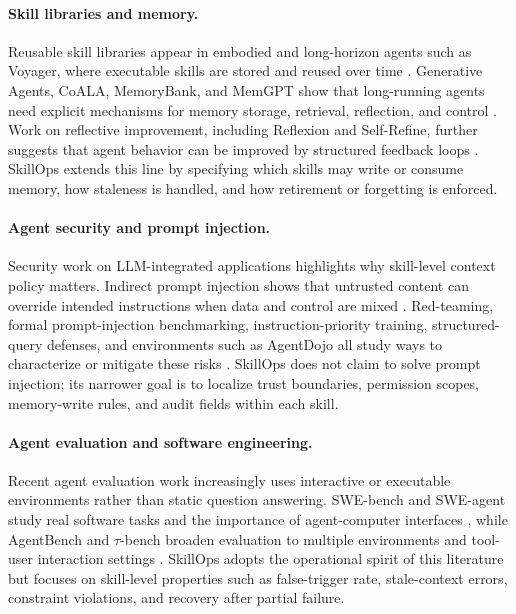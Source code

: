 \documentclass[11pt]{article}
\begin{document}
\paragraph{Skill libraries and memory.}

Reusable skill libraries appear in embodied and long-horizon agents such as
Voyager, where executable skills are stored and reused over time
\citep{wang2024voyager}. Generative Agents, CoALA, MemoryBank, and MemGPT show
that long-running agents need explicit mechanisms for memory storage,
retrieval, reflection, and control
\citep{park2023generativeagents,sumers2024coala,zhong2024memorybank,packer2023memgpt}.
Work on reflective improvement, including Reflexion and Self-Refine, further
suggests that agent behavior can be improved by structured feedback loops
\citep{shinn2023reflexion,madaan2023selfrefine}. SkillOps extends this line by
specifying which skills may write or consume memory, how staleness is handled,
and how retirement or forgetting is enforced.

\paragraph{Agent security and prompt injection.}

Security work on LLM-integrated applications highlights why skill-level context
policy matters. Indirect prompt injection shows that untrusted content can
override intended instructions when data and control are mixed
\citep{greshake2023notwhat}. Red-teaming, formal prompt-injection benchmarking,
instruction-priority training, structured-query defenses, and environments such
as AgentDojo all study ways to characterize or mitigate these risks
\citep{ganguli2022redteaming,liu2024formalizingprompt,wallace2024instructionhierarchy,chen2025struq,debenedetti2024agentdojo}.
SkillOps does not claim to solve prompt injection; its narrower goal is to
localize trust boundaries, permission scopes, memory-write rules, and audit
fields within each skill.

\paragraph{Agent evaluation and software engineering.}

Recent agent evaluation work increasingly uses interactive or executable
environments rather than static question answering. SWE-bench and SWE-agent
study real software tasks and the importance of agent-computer interfaces
\citep{jimenez2024swebench,yang2024sweagent}, while AgentBench and
\(\tau\)-bench broaden evaluation to multiple environments and tool-user
interaction settings \citep{liu2024agentbench,yao2025taubench}.
SkillOps adopts the operational spirit of this literature but focuses on
skill-level properties such as false-trigger rate, stale-context errors,
constraint violations, and recovery after partial failure.
\end{document}
